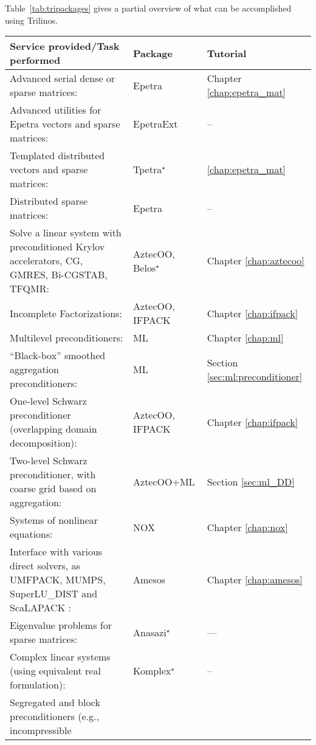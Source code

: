 Table~\ref{tab:tripackages} gives a partial overview of what can be
accomplished using Trilinos.
\begin{table}[htbp]
  \centering
  \begin{tabular}{| p{8cm} | p{2.5cm} | p{3cm} |}
    \hline
    {\bf Service provided/Task performed} & {\bf Package} & {\bf Tutorial}\\
    \hline
    \hline
    Advanced serial dense or sparse matrices: & Epetra 
    & Chapter \ref{chap:epetra_mat} \\
    Advanced utilities for Epetra vectors and sparse matrices: &
    EpetraExt & --  
    \\
    \hline
    Templated distributed vectors and sparse matrices: & Tpetra$^\star$
    & \ref{chap:epetra_mat} \\
    \hline
    Distributed sparse matrices:& Epetra & -- \\
    \hline
    Solve a linear system with preconditioned Krylov accelerators, 
    CG, GMRES, Bi-CGSTAB, TFQMR:& AztecOO, Belos$^\star$ &
    Chapter \ref{chap:aztecoo} \\
    \hline
    Incomplete Factorizations:& AztecOO, \newline IFPACK &
    Chapter \ref{chap:ifpack} \\
    \hline
    Multilevel  preconditioners: & ML & Chapter \ref{chap:ml} \\
    \hline
    ``Black-box'' smoothed aggregation preconditioners:& ML & Section
    \ref{sec:ml:preconditioner} \\
    \hline
    One-level Schwarz preconditioner (overlapping domain
    decomposition):& AztecOO, \newline IFPACK & Chapter \ref{chap:ifpack} \\
    Two-level Schwarz preconditioner, with coarse grid based on
    aggregation:& AztecOO+ML & Section \ref{sec:ml_DD} \\
    \hline
    Systems of nonlinear equations:& NOX & Chapter \ref{chap:nox} \\
    Interface with various direct solvers, as UMFPACK, MUMPS, SuperLU\_DIST
    and ScaLAPACK :& Amesos & Chapter \ref{chap:amesos} \\
    \hline
    Eigenvalue problems for sparse matrices:& Anasazi$^\star$ &
---
    \\
    \hline
    Complex linear systems (using equivalent real formulation):&
    Komplex$^\star$ & -- \\
    \hline
    Segregated and block preconditioners (e.g., incompressible

\end{tabular}
\end{table}
